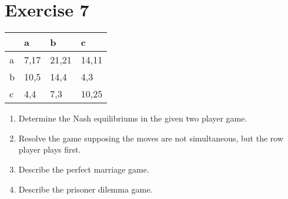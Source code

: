 \documentclass[\main/main.tex]{subfiles}
\begin{document}
\section{Exercise 7}
\begin{table}
  \begin{tabular}{LLLL}
      & a    & b     & c     \\
    \hline
    a & 7,17 & 21,21 & 14,11 \\
    b & 10,5 & 14,4  & 4,3   \\
    c & 4,4  & 7,3   & 10,25
  \end{tabular}
\end{table}

\begin{enumerate}
  \item Determine the Nash equilibriums in the given two player game.
  \item Resolve the game supposing the moves are not simultaneous, but the row player plays first.
  \item Describe the perfect marriage game.
  \item Describe the prisoner dilemma game.
\end{enumerate}
\end{document}
